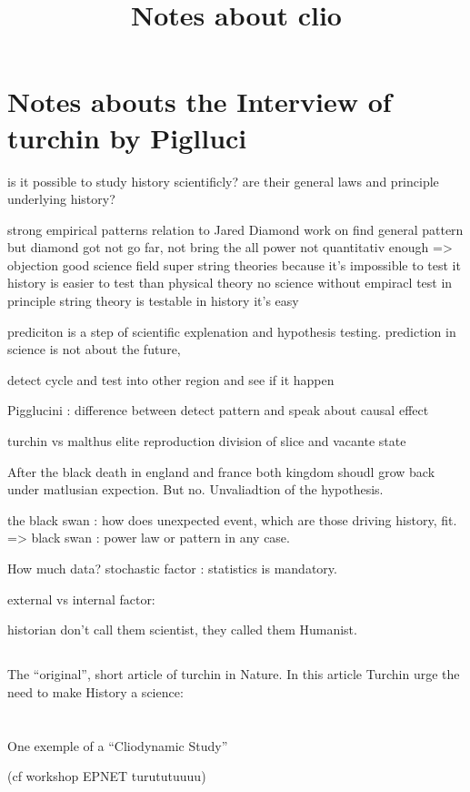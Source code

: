 \documentclass{beamer}
\title{Notes about clio}
\begin{document}
\section{Notes abouts the Interview of turchin by Piglluci}
	is it possible to study history scientificly?
	are their general laws and principle underlying history?

	strong empirical patterns relation to Jared Diamond work on find general pattern
but diamond got not go far, not bring the all power not quantitativ enough
=> objection good science field super string theories because it's impossible to test it
	history is easier to test than physical theory
	no science without empiracl test
	in principle string theory is testable
	in history it's easy
					
prediciton is a step of scientific explenation and hypothesis testing.
prediction in science is not about the future,

detect cycle and test into other region and see if it happen

Pigglucini : difference between detect pattern and speak about causal effect

turchin vs malthus
elite reproduction division of slice and vacante state


After the black death in england and france both kingdom shoudl grow back under matlusian expection. But no. Unvaliadtion of the hypothesis.

the black swan : how does unexpected event, which are those driving history, fit. => black swan : power law or pattern in any case.

How much data? stochastic factor : statistics is mandatory.

external vs internal factor:


historian don't call them scientist, they called them Humanist.

\begin{frame}
    \section{\cite{turchin_arise_2008}}
    The ``original'', short article of turchin in Nature. In this article Turchin urge the need to make History a science:
\end{frame}


    \section{\cite{turchin_war_2013}}
\begin{frame}{One exemple of a ``Cliodynamic Study''}

    \cite{turchin_war_2013}

    (cf workshop EPNET turututuuuu)


\end{frame}
\end{document}
